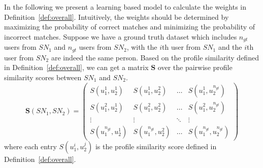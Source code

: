 \documentclass[letterpaper,12pt]{article}
\begin{document}
In the following we present a learning based model to calculate the weights in Definition~\ref{def:overall}. %
Intuitively, the weights should be determined by maximizing the probability of correct matches and minimizing the probability of incorrect matches. %
Suppose we have a ground truth dataset which includes $n_{gt}$ users from $SN_{1}$ and $n_{gt}$ users from $SN_{2}$, with the $i$th user from $SN_{1}$ and the $i$th user from $SN_{2}$ are indeed the same person.
Based on the profile similarity defined in Definition~\ref{def:overall}, we can get a matrix $\boldsymbol{S}$ over the pairwise profile similarity scores between $SN_{1}$ and $SN_{2}$.
%
\begin{equation}
\mathbf{S}(SN_{1},SN_{2})= \left(\begin{array}{cccc}
S(u_{1}^{1},u_{2}^{1}) & S(u_{1}^{1},u_{2}^{2}) & \ldots & S(u_{1}^{1},u_{2}^{n_{gt}})\\
S(u_{1}^{2},u_{2}^{1}) & S(u_{1}^{2},u_{2}^{2}) & \ldots & S(u_{1}^{2},u_{2}^{n_{gt}})\\
\vdots & \vdots & \ddots & \vdots\\
S(u_{1}^{n_{gt}},u_{2}^{1}) & S(u_{1}^{n_{gt}},u_{2}^{2}) & \ldots & S(u_{1}^{n_{gt}},u_{2}^{n_{gt}})
\end{array}\right)
\end{equation}
where each entry $S(u_{1}^{i}, u_{2}^{j})$ is the profile similarity score defined in Definition~\ref{def:overall}.
\end{document}
